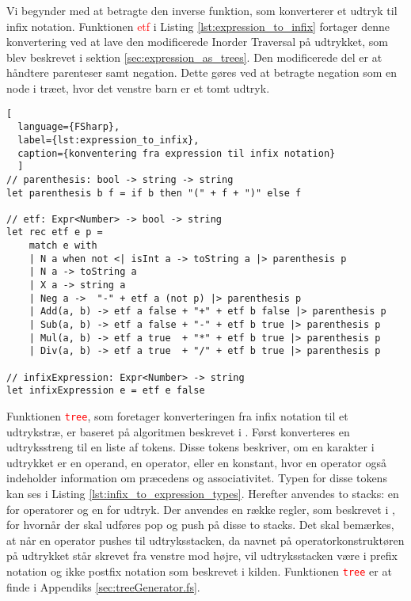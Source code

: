 Vi begynder med at betragte den inverse funktion, som konverterer et udtryk til infix notation. Funktionen \textcolor{red}{etf} i Listing \ref{lst:expression_to_infix} fortager denne konvertering ved at lave den modificerede Inorder Traversal på udtrykket, som blev beskrevet i sektion \ref{sec:expression_as_trees}. Den modificerede del er at håndtere parenteser samt negation. Dette gøres ved at betragte negation som en node i træet, hvor det venstre barn er et tomt udtryk.

\begin{lstlisting}[
  language={FSharp}, 
  label={lst:expression_to_infix}, 
  caption={konventering fra expression til infix notation}
  ]
// parenthesis: bool -> string -> string
let parenthesis b f = if b then "(" + f + ")" else f

// etf: Expr<Number> -> bool -> string
let rec etf e p =
    match e with
    | N a when not <| isInt a -> toString a |> parenthesis p
    | N a -> toString a
    | X a -> string a
    | Neg a ->  "-" + etf a (not p) |> parenthesis p
    | Add(a, b) -> etf a false + "+" + etf b false |> parenthesis p
    | Sub(a, b) -> etf a false + "-" + etf b true |> parenthesis p
    | Mul(a, b) -> etf a true  + "*" + etf b true |> parenthesis p
    | Div(a, b) -> etf a true  + "/" + etf b true |> parenthesis p

// infixExpression: Expr<Number> -> string
let infixExpression e = etf e false
\end{lstlisting}

Funktionen \textcolor{red}{\texttt{tree}}, som foretager konverteringen fra infix notation til et udtrykstræ, er baseret på algoritmen beskrevet i \cite{convert_expression}. Først konverteres en udtryksstreng til en liste af tokens. Disse tokens beskriver, om en karakter i udtrykket er en operand, en operator, eller en konstant, hvor en operator også indeholder information om præcedens og associativitet. Typen for disse tokens kan ses i Listing \ref{lst:infix_to_expression_types}. Herefter anvendes to stacks: en for operatorer og en for udtryk. Der anvendes en række regler, som beskrevet i \cite{convert_expression}, for hvornår der skal udføres pop og push på disse to stacks. Det skal bemærkes, at når en operator pushes til udtryksstacken, da navnet på operatorkonstruktøren på udtrykket står skrevet fra venstre mod højre, vil udtryksstacken være i prefix notation og ikke postfix notation som beskrevet i kilden. Funktionen \textcolor{red}{\texttt{tree}} er at finde i Appendiks \ref{sec:treeGenerator.fs}.

